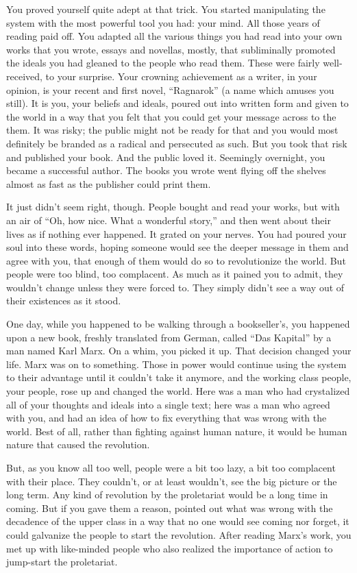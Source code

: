 \documentclass[char]{airship}
\begin{document}
You proved yourself quite adept at that trick.  You started
manipulating the system with the most powerful tool you had: your
mind.  All those years of reading paid off.  You adapted all the
various things you had read into your own works that you wrote, essays
and novellas, mostly, that subliminally promoted the ideals you had
gleaned to the people who read them.  These were fairly well-received,
to your surprise.  Your crowning achievement as a writer, in your
opinion, is your recent and first novel, ``Ragnarok'' (a name which
amuses you still).  It is you, your beliefs and ideals, poured out
into written form and given to the world in a way that you felt that
you could get your message across to the them.  It was risky; the
public might not be ready for that and you would most definitely be
branded as a radical and persecuted as such.  But you took that risk
and published your book.  And the public loved it.  Seemingly
overnight, you became a successful author.  The books you wrote went
flying off the shelves almost as fast as the publisher could print
them.

It just didn't seem right, though.  People bought and read your works,
but with an air of ``Oh, how nice.  What a wonderful story,'' and then
went about their lives as if nothing ever happened.  It grated on your
nerves.  You had poured your soul into these words, hoping someone
would see the deeper message in them and agree with you, that enough
of them would do so to revolutionize the world.  But people were too
blind, too complacent.  As much as it pained you to admit, they
wouldn't change unless they were forced to.  They simply didn't see a
way out of their existences as it stood.

One day, while you happened to be walking through a bookseller's, you
happened upon a new book, freshly translated from German, called ``Das
Kapital'' by a man named Karl Marx.  On a whim, you picked it up.
That decision changed your life.  Marx was on to something.  Those in
power would continue using the system to their advantage until it
couldn't take it anymore, and the working class people, your people,
rose up and changed the world.  Here was a man who had crystalized all
of your thoughts and ideals into a single text; here was a man who
agreed with you, and had an idea of how to fix everything that was
wrong with the world.  Best of all, rather than fighting against human
nature, it would be human nature that caused the revolution.

But, as you know all too well, people were a bit too lazy, a bit too
complacent with their place.  They couldn't, or at least wouldn't, see
the big picture or the long term.  Any kind of revolution by the
proletariat would be a long time in coming.  But if you gave them a
reason, pointed out what was wrong with the decadence of the upper
class in a way that no one would see coming nor forget, it could
galvanize the people to start the revolution.  After reading Marx's
work, you met up with like-minded people who also realized the
importance of action to jump-start the proletariat.
\end{document}
